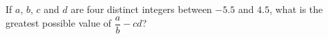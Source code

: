 If $a$, $b$, $c$ and $d$ are four distinct integers between $-5.5$ and $4.5$, what is the greatest possible value of $\dfrac {a}{b}-cd$?
